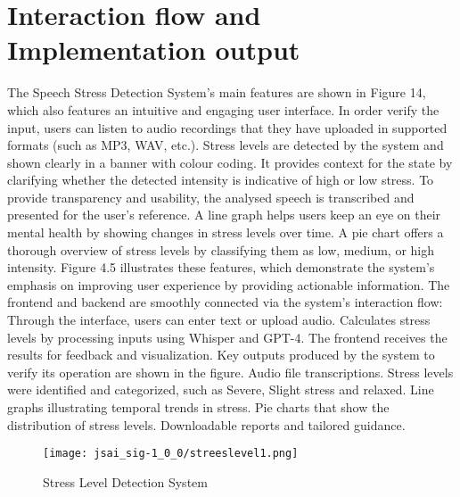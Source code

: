 \documentclass[a4j, twocolumn]{article}
\begin{document}
 \section{Interaction flow and Implementation output}
 \vspace{10pt} %
The Speech Stress Detection System's main features are shown in Figure 14, which also features an intuitive and engaging user interface. In order verify the input, users can listen to audio recordings that they have uploaded in supported formats (such as MP3, WAV, etc.). Stress levels are detected by the system and shown clearly in a banner with colour coding. It provides context for the state by clarifying whether the detected intensity is indicative of high or low stress. To provide transparency and usability, the analysed speech is transcribed and presented for the user's reference. A line graph helps users keep an eye on their mental health by showing changes in stress levels over time. A pie chart offers a thorough overview of stress levels by classifying them as low, medium, or high intensity. Figure 4.5 illustrates these features, which demonstrate the system's emphasis on improving user experience by providing actionable information. The frontend and backend are smoothly connected via the system's interaction flow:  Through the interface, users can enter text or upload audio. Calculates stress levels by processing inputs using Whisper and GPT-4. The frontend receives the results for feedback and visualization. Key outputs produced by the system to verify its operation are shown in the figure. Audio file transcriptions. 
Stress levels were identified and categorized, such as Severe, Slight stress and relaxed. Line graphs illustrating temporal trends in stress. Pie charts that show the distribution of stress levels.  Downloadable reports and tailored guidance. 
 \begin{figure}[H]
    \centering
    \texttt{[image: jsai\_sig-1\_0\_0/streeslevel1.png]}
    \caption{Stress Level Detection System}
    \label{fig:system_architecture}
\end{figure}
\end{document}
